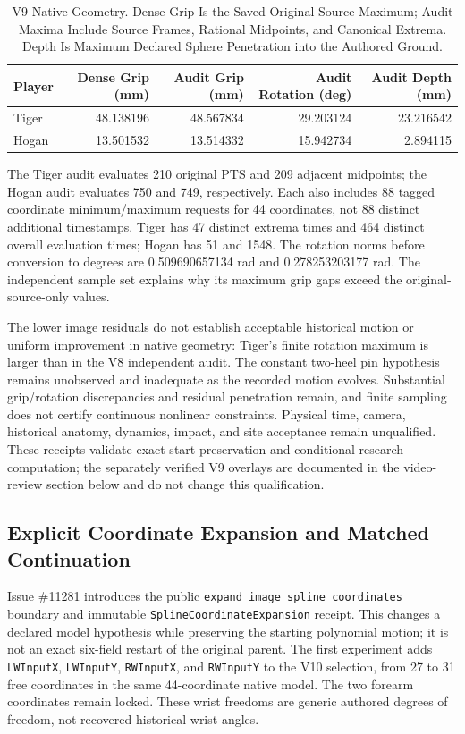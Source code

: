 \documentclass[11pt,letterpaper]{article}
\newcommand{\code}[1]{\nolinkurl{#1}}
\begin{document}
\begin{table}[ht]\centering\small
\begin{tabular}{@{}lrrrr@{}}
\toprule Player & Dense Grip (mm) & Audit Grip (mm) & Audit Rotation (deg) & Audit Depth (mm)\\\midrule
Tiger & 48.138196 & 48.567834 & 29.203124 & 23.216542\\
Hogan & 13.501532 & 13.514332 & 15.942734 & 2.894115\\
\bottomrule
\end{tabular}
\caption{V9 Native Geometry. Dense Grip Is the Saved Original-Source Maximum;
Audit Maxima Include Source Frames, Rational Midpoints, and Canonical Extrema.
Depth Is Maximum Declared Sphere Penetration into the Authored Ground.}
\end{table}
The Tiger audit evaluates 210 original PTS and 209 adjacent midpoints; the
Hogan audit evaluates 750 and 749, respectively. Each also includes 88 tagged
coordinate minimum/maximum requests for 44 coordinates, not 88 distinct
additional timestamps. Tiger has 47 distinct extrema times and 464 distinct
overall evaluation times; Hogan has 51 and 1548. The rotation norms before
conversion to degrees are 0.509690657134 rad and 0.278253203177 rad.
The independent sample set explains why its maximum grip gaps exceed the
original-source-only values.

The lower image residuals do not establish acceptable historical motion or
uniform improvement in native geometry: Tiger's finite rotation maximum is
larger than in the V8 independent audit. The constant two-heel pin hypothesis
remains unobserved and inadequate as the recorded motion evolves. Substantial
grip/rotation discrepancies and residual penetration remain, and finite
sampling does not certify continuous nonlinear constraints. Physical time,
camera, historical anatomy, dynamics, impact, and site acceptance remain
unqualified. These receipts validate exact start preservation and conditional
research computation; the separately verified V9 overlays are documented in the video-review
section below and do not change this qualification.

\subsection{Explicit Coordinate Expansion and Matched Continuation}
\label{sec:coordinate-expansion}
Issue \#11281 introduces the public
\code{expand_image_spline_coordinates} boundary and immutable
\code{SplineCoordinateExpansion} receipt. This changes a declared model
hypothesis while preserving the starting polynomial motion; it is not an
exact six-field restart of the original parent. The first experiment adds
\code{LWInputX}, \code{LWInputY}, \code{RWInputX}, and \code{RWInputY}
to the V10 selection, from 27 to 31 free coordinates in the same 44-coordinate
native model. The two forearm coordinates remain locked. These wrist freedoms
are generic authored degrees of freedom, not recovered historical wrist angles.
\end{document}
